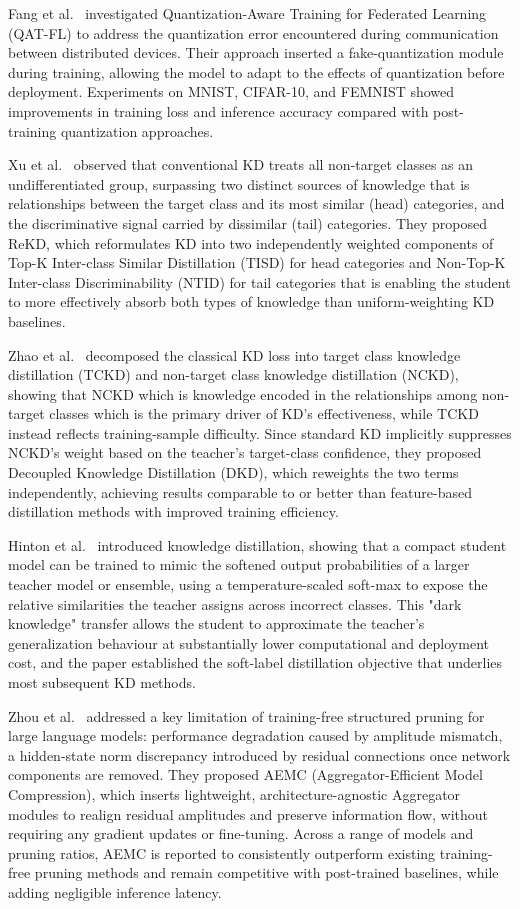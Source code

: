 \documentclass[oneside,a4paper,12pt]{report}
\begin{document}
Fang et al.~\cite{fang2026} investigated Quantization-Aware Training for Federated Learning (QAT-FL) to address the quantization error encountered during communication between distributed devices. Their approach inserted a fake-quantization module during training, allowing the model to adapt to the effects of quantization before deployment. Experiments on MNIST, CIFAR-10, and FEMNIST showed improvements in training loss and inference accuracy compared with post- training quantization approaches.

Xu et al.~\cite{xu2024} observed that conventional KD treats all non-target classes as an undifferentiated group, surpassing two distinct sources of knowledge that is relationships between the target class and its most similar (head) categories, and the discriminative signal carried by dissimilar (tail) categories. They proposed ReKD, which reformulates KD into two independently weighted components of Top-K Inter-class Similar Distillation (TISD) for head categories and Non-Top-K Inter-class Discriminability (NTID) for tail categories that is enabling the student to more effectively absorb both types of knowledge than uniform-weighting KD baselines.

Zhao et al.~\cite{zhao2022} decomposed the classical KD loss into target class knowledge distillation (TCKD) and non-target class knowledge distillation (NCKD), showing that NCKD which is knowledge encoded in the relationships among non-target classes which is the primary driver of KD's effectiveness, while TCKD instead reflects training-sample difficulty. Since standard KD implicitly suppresses NCKD's weight based on the teacher's target-class confidence, they proposed Decoupled Knowledge Distillation (DKD), which reweights the two terms independently, achieving results comparable to or better than feature-based distillation methods with improved training efficiency.

Hinton et al.~\cite{hinton2015} introduced knowledge distillation, showing that a compact student model can be trained to mimic the softened output probabilities of a larger teacher model or ensemble, using a temperature-scaled soft-max to expose the relative similarities the teacher assigns across incorrect classes. This "dark knowledge" transfer allows the student to approximate the teacher's generalization behaviour at substantially lower computational and deployment cost, and the paper established the soft-label distillation objective that underlies most subsequent KD methods.

Zhou et al.~\cite{zhou2026} addressed a key limitation of training-free structured pruning for large language models: performance degradation caused by amplitude mismatch, a hidden-state norm discrepancy introduced by residual connections once network components are removed. They proposed AEMC (Aggregator-Efficient Model Compression), which inserts lightweight, architecture-agnostic Aggregator modules to realign residual amplitudes and preserve information flow, without requiring any gradient updates or fine-tuning. Across a range of models and pruning ratios, AEMC is reported to consistently outperform existing training-free pruning methods and remain competitive with post-trained baselines, while adding negligible inference latency.
\end{document}
